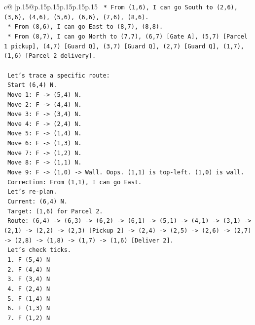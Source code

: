 \documentclass{article}
\begin{document}
{\begin{supertabular}{c@{$\;$}|p{.15\linewidth}@{}p{.15\linewidth}p{.15\linewidth}p{.15\linewidth}p{.15\linewidth}p{.15\linewidth}}
{{{\texttt{    *   From (1,6), I can go South to (2,6), (3,6), (4,6), (5,6), (6,6), (7,6), (8,6).} \\
\texttt{    *   From (8,6), I can go East to (8,7), (8,8).} \\
\texttt{    *   From (8,7), I can go North to (7,7), (6,7) {[}Gate A{]}, (5,7) {[}Parcel 1 pickup{]}, (4,7) {[}Guard Q{]}, (3,7) {[}Guard Q{]}, (2,7) {[}Guard Q{]}, (1,7), (1,6) {[}Parcel 2 delivery{]}.} \\
\\ 
\texttt{    Let's trace a specific route:} \\
\texttt{    Start (6,4) N.} \\
\texttt{    Move 1: F {-}> (5,4) N.} \\
\texttt{    Move 2: F {-}> (4,4) N.} \\
\texttt{    Move 3: F {-}> (3,4) N.} \\
\texttt{    Move 4: F {-}> (2,4) N.} \\
\texttt{    Move 5: F {-}> (1,4) N.} \\
\texttt{    Move 6: F {-}> (1,3) N.} \\
\texttt{    Move 7: F {-}> (1,2) N.} \\
\texttt{    Move 8: F {-}> (1,1) N.} \\
\texttt{    Move 9: F {-}> (1,0) {-}> Wall. Oops. (1,1) is top{-}left. (1,0) is wall.} \\
\texttt{    Correction: From (1,1), I can go East.} \\
\texttt{    Let's re{-}plan.} \\
\texttt{    Current: (6,4) N.} \\
\texttt{    Target: (1,6) for Parcel 2.} \\
\texttt{    Route: (6,4) {-}> (6,3) {-}> (6,2) {-}> (6,1) {-}> (5,1) {-}> (4,1) {-}> (3,1) {-}> (2,1) {-}> (2,2) {-}> (2,3) {[}Pickup 2{]} {-}> (2,4) {-}> (2,5) {-}> (2,6) {-}> (2,7) {-}> (2,8) {-}> (1,8) {-}> (1,7) {-}> (1,6) {[}Deliver 2{]}.} \\
\texttt{    Let's check ticks.} \\
\texttt{    1. F (5,4) N} \\
\texttt{    2. F (4,4) N} \\
\texttt{    3. F (3,4) N} \\
\texttt{    4. F (2,4) N} \\
\texttt{    5. F (1,4) N} \\
\texttt{    6. F (1,3) N} \\
\texttt{    7. F (1,2) N} \\
}}}
\end{supertabular}}
\end{document}
